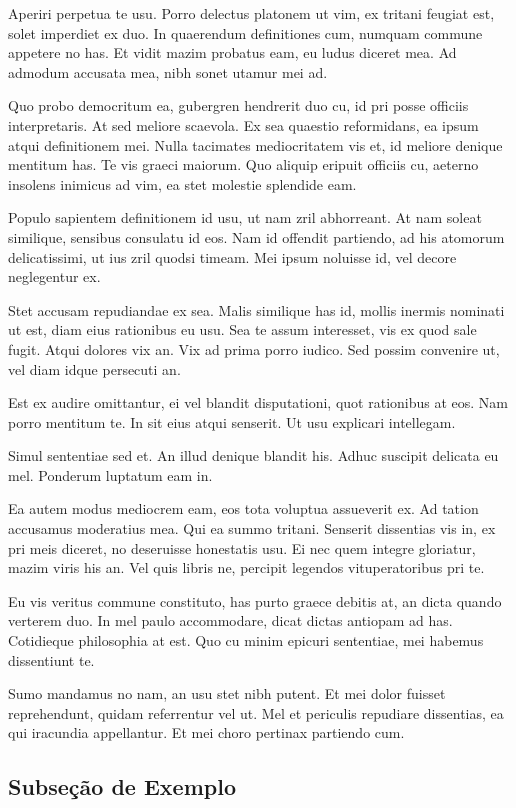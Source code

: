 \documentclass[
	12pt,				%
	openright,			%
	oneside,			%
	a4paper,			%
	english,			%
	french,				%
	spanish,			%
	brazil,				%
	]{abntex2}
\begin{document}
Aperiri perpetua te usu. Porro delectus platonem ut vim, ex tritani feugiat est, solet imperdiet ex duo. In quaerendum definitiones cum, numquam commune appetere no has. Et vidit mazim probatus eam, eu ludus diceret mea. Ad admodum accusata mea, nibh sonet utamur mei ad.

Quo probo democritum ea, gubergren hendrerit duo cu, id pri posse officiis interpretaris. At sed meliore scaevola. Ex sea quaestio reformidans, ea ipsum atqui definitionem mei. Nulla tacimates mediocritatem vis et, id meliore denique mentitum has. Te vis graeci maiorum. Quo aliquip eripuit officiis cu, aeterno insolens inimicus ad vim, ea stet molestie splendide eam.

Populo sapientem definitionem id usu, ut nam zril abhorreant. At nam soleat similique, sensibus consulatu id eos. Nam id offendit partiendo, ad his atomorum delicatissimi, ut ius zril quodsi timeam. Mei ipsum noluisse id, vel decore neglegentur ex.

Stet accusam repudiandae ex sea. Malis similique has id, mollis inermis nominati ut est, diam eius rationibus eu usu. Sea te assum interesset, vis ex quod sale fugit. Atqui dolores vix an. Vix ad prima porro iudico. Sed possim convenire ut, vel diam idque persecuti an.

Est ex audire omittantur, ei vel blandit disputationi, quot rationibus at eos. Nam porro mentitum te. In sit eius atqui senserit. Ut usu explicari intellegam.

Simul sententiae sed et. An illud denique blandit his. Adhuc suscipit delicata eu mel. Ponderum luptatum eam in.

Ea autem modus mediocrem eam, eos tota voluptua assueverit ex. Ad tation accusamus moderatius mea. Qui ea summo tritani. Senserit dissentias vis in, ex pri meis diceret, no deseruisse honestatis usu. Ei nec quem integre gloriatur, mazim viris his an. Vel quis libris ne, percipit legendos vituperatoribus pri te.

Eu vis veritus commune constituto, has purto graece debitis at, an dicta quando verterem duo. In mel paulo accommodare, dicat dictas antiopam ad has. Cotidieque philosophia at est. Quo cu minim epicuri sententiae, mei habemus dissentiunt te.

Sumo mandamus no nam, an usu stet nibh putent. Et mei dolor fuisset reprehendunt, quidam referrentur vel ut. Mel et periculis repudiare dissentias, ea qui iracundia appellantur. Et mei choro pertinax partiendo cum.

\subsection{Subseção de Exemplo}
\end{document}

